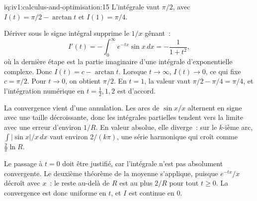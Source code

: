 \begin{solution}{iq:iv1:calculus-and-optimisation:15}
L'intégrale vaut $\pi/2$, avec $I(t) = \pi/2 - \arctan t$ et $I(1) = \pi/4$.

Dériver sous le signe intégral supprime le $1/x$ gênant~:
\[
I'(t) = -\int_0^\infty e^{-tx}\sin x\,dx = -\frac{1}{1 + t^2},
\]
où la dernière étape est la partie imaginaire d'une intégrale d'exponentielle complexe. Donc $I(t) = c - \arctan t$. Lorsque $t \to \infty$, $I(t) \to 0$, ce qui fixe $c = \pi/2$. Pour $t \to 0$, on obtient $\pi/2$. En $t = 1$, la valeur vaut $\pi/2 - \pi/4 = \pi/4$, et l'intégration numérique en $t = \frac12, 1, 2$ est d'accord.

La convergence vient d'une annulation. Les arcs de $\sin x/x$ alternent en signe avec une taille décroissante, donc les intégrales partielles tendent vers la limite avec une erreur d'environ $1/R$. En valeur absolue, elle diverge~: sur le $k$-ième arc, $\int|\sin x|/x\,dx$ vaut environ $2/(k\pi)$, une série harmonique qui croît comme $\frac{2}{\pi}\ln R$.

Le passage à $t = 0$ doit être justifié, car l'intégrale n'est pas absolument convergente. Le deuxième théorème de la moyenne s'applique, puisque $e^{-tx}/x$ décroît avec $x$~: le reste au-delà de $R$ est au plus $2/R$ pour tout $t \ge 0$. La convergence est donc uniforme en $t$, et $I$ est continue en 0.



\end{solution}

